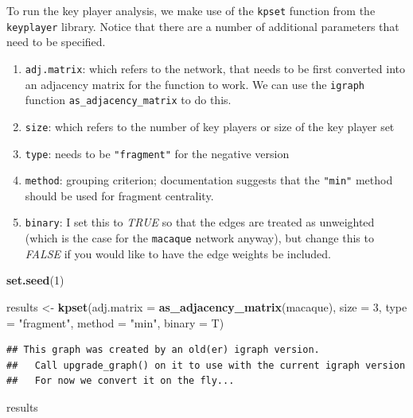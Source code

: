 \documentclass[
]{book}
\newenvironment{Shaded}{\begin{snugshade}}{\end{snugshade}}
\newcommand{\AttributeTok}[1]{\textcolor[rgb]{0.13,0.29,0.53}{#1}}
\newcommand{\DecValTok}[1]{\textcolor[rgb]{0.00,0.00,0.81}{#1}}
\newcommand{\FunctionTok}[1]{\textcolor[rgb]{0.13,0.29,0.53}{\textbf{#1}}}
\newcommand{\NormalTok}[1]{#1}
\newcommand{\OtherTok}[1]{\textcolor[rgb]{0.56,0.35,0.01}{#1}}
\newcommand{\StringTok}[1]{\textcolor[rgb]{0.31,0.60,0.02}{#1}}
\providecommand{\tightlist}{%
  \setlength{\itemsep}{0pt}\setlength{\parskip}{0pt}}
\begin{document}
To run the key player analysis, we make use of the \texttt{kpset} function from the \texttt{keyplayer} library. Notice that there are a number of additional parameters that need to be specified.

\begin{enumerate}
\def\labelenumi{(\roman{enumi})}
\tightlist
\item
  \texttt{adj.matrix}: which refers to the network, that needs to be first converted into an adjacency matrix for the function to work. We can use the \texttt{igraph} function \texttt{as\_adjacency\_matrix} to do this.
\item
  \texttt{size}: which refers to the number of key players or size of the key player set
\item
  \texttt{type}: needs to be \texttt{"fragment"} for the negative version
\item
  \texttt{method}: grouping criterion; documentation suggests that the \texttt{"min"} method should be used for fragment centrality.
\item
  \texttt{binary}: I set this to \emph{TRUE} so that the edges are treated as unweighted (which is the case for the \texttt{macaque} network anyway), but change this to \emph{FALSE} if you would like to have the edge weights be included.
\end{enumerate}

\begin{Shaded}
\begin{Highlighting}[]
\FunctionTok{set.seed}\NormalTok{(}\DecValTok{1}\NormalTok{)}

\NormalTok{results }\OtherTok{\textless{}{-}} \FunctionTok{kpset}\NormalTok{(}\AttributeTok{adj.matrix =} \FunctionTok{as\_adjacency\_matrix}\NormalTok{(macaque), }
                 \AttributeTok{size =} \DecValTok{3}\NormalTok{, }
                 \AttributeTok{type =} \StringTok{"fragment"}\NormalTok{, }
                 \AttributeTok{method =} \StringTok{"min"}\NormalTok{, }
                 \AttributeTok{binary =}\NormalTok{ T)}
\end{Highlighting}
\end{Shaded}

\begin{verbatim}
## This graph was created by an old(er) igraph version.
##   Call upgrade_graph() on it to use with the current igraph version
##   For now we convert it on the fly...
\end{verbatim}

\begin{Shaded}
\begin{Highlighting}[]
\NormalTok{results}
\end{Highlighting}
\end{Shaded}
\end{document}
